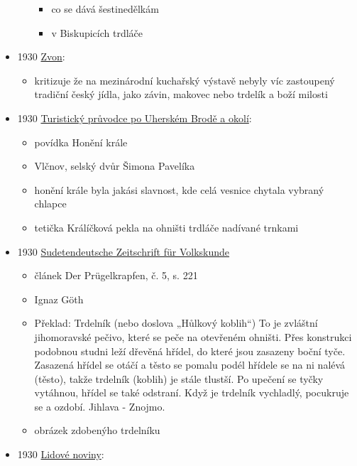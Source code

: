 \begin{itemize}
\begin{itemize}
    \begin{itemize}
    \tightlist
    \item
      co se dává šestinedělkám
    \item
      v Biskupicích trdláče
    \end{itemize}
  \end{itemize}
\item
  1930
  \href{https://ceskadigitalniknihovna.cz/view/uuid:962edf50-9004-11e3-83a0-005056825209?page=uuid\%3Ac58d1770-9613-11e3-8b69-005056825209&fulltext=trdeln\%C3\%ADk\%20OR\%20trdeln\%C3\%ADky\%20OR\%20trdeln\%C3\%ADk\%C5\%AF&source=mzk}{Zvon}:

  \begin{itemize}
  \tightlist
  \item
    kritizuje že na mezinárodní kuchařský výstavě nebyly víc zastoupený
    tradiční český jídla, jako závin, makovec nebo trdelík a boží
    milosti
  \end{itemize}
\item
  1930
  \href{https://ceskadigitalniknihovna.cz/uuid/uuid:0ef229ae-ef9e-4c80-b6ca-8a7a99a85b67}{Turistický
  průvodce po Uherském Brodě a okolí}:

  \begin{itemize}
  \tightlist
  \item
    povídka Honění krále
  \item
    Vlčnov, selský dvůr Šimona Pavelíka
  \item
    honění krále byla jakási slavnost, kde celá vesnice chytala vybraný
    chlapce
  \item
    tetička Králíčková pekla na ohništi trdláče nadívané trnkami
  \end{itemize}
\item
  1930
  \href{https://ceskadigitalniknihovna.cz/uuid/uuid:c691a682-5723-11ee-b168-005056841fbb}{Sudetendeutsche
  Zeitschrift für Volkskunde}

  \begin{itemize}
  \tightlist
  \item
    článek Der Prügelkrapfen, č. 5, s. 221
  \item
    Ignaz Göth
  \item
    Překlad: Trdelník (nebo doslova „Hůlkový koblih``) To je zvláštní
    jihomoravské pečivo, které se peče na otevřeném ohništi. Přes
    konstrukci podobnou studni leží dřevěná hřídel, do které jsou
    zasazeny boční tyče. Zasazená hřídel se otáčí a těsto se pomalu
    podél hřídele se na ni nalévá (těsto), takže trdelník (koblih) je
    stále tlustší. Po upečení se tyčky vytáhnou, hřídel se také
    odstraní. Když je trdelník vychladlý, pocukruje se a ozdobí. Jihlava
    - Znojmo.
  \item
    obrázek zdobenýho trdelníku
  \end{itemize}
\item
  1930
  \href{https://ceskadigitalniknihovna.cz/uuid/uuid:af245650-9670-11dc-8c7e-000d606f5dc6}{Lidové
  noviny}:


\end{itemize}
